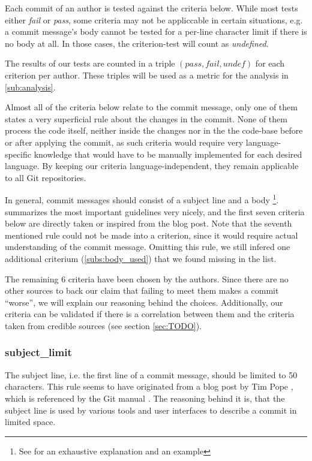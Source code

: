 
Each commit of an author is tested against the criteria below. While most tests either \emph{fail} or \emph{pass}, some criteria may not be appliccable in certain situations, e.g. a commit message's body cannot be tested for a per-line character limit if there is no body at all. In those cases, the criterion-test will count as \emph{undefined}.

The results of our tests are counted in a triple $(pass, fail, undef)$ for each criterion per author. These triples will be used as a metric for the analysis in \ref{sub:analysis}.

Almost all of the criteria below relate to the commit message, only one of them states a very superficial rule about the changes in the commit. None of them process the code itself, neither inside the changes nor in the the code-base before or after applying the commit, as such criteria would require very language-specific knowledge that would have to be manually implemented for each desired language. By keeping our criteria language-independent, they remain applicable to all Git repositories.

In general, commit messages should consist of a subject line and a body \footnote{See \cite{OffGuide} for an exhaustive explanation and an example}. \cite{CB} summarizes the most important guidelines very nicely, and the first seven criteria below are directly taken or inspired from the blog post. Note that the seventh mentioned rule could not be made into a criterion, since it would require actual understanding of the commit message. Omitting this rule, we still infered one additional criterium (\ref{subs:body_used}) that we found missing in the list.

The remaining 6 criteria have been chosen by the authors. Since there are no other sources to back our claim that failing to meet them makes a commit ``worse'', we will explain our reasoning behind the choices. Additionally, our criteria can be validated if there is a correlation between them and the criteria taken from credible sources (see section \ref{sec:TODO}). %

\subsubsection{subject\_limit}
\label{subs:subject_limit}
The subject line, i.e. the first line of a commit message, should be limited to 50 characters. This rule seems to have originated from a blog post by Tim Pope \cite{TP}, which is referenced by the Git manual \cite{OffGuide}. The reasoning behind it is, that the subject line is used by various tools and user interfaces to describe a commit in limited space.

